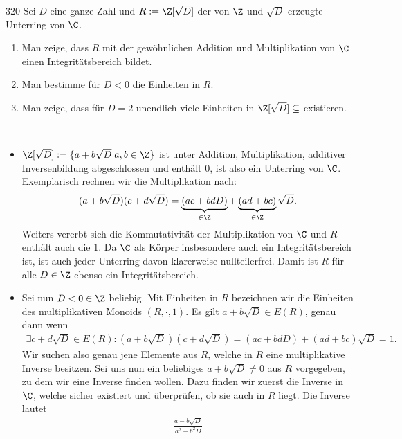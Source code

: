 \begin{algebraUE}{320}
Sei $D$ eine ganze Zahl und $R := \Z[\sqrt{D}]$ der von $\Z$ und $\sqrt{D}$
erzeugte Unterring von $\C$.
\begin{enumerate}
  \item Man zeige, dass $R$ mit der gewöhnlichen Addition und Multiplikation von $\C$
  einen Integritätsbereich bildet.
  \item Man bestimme für $D < 0$ die Einheiten in $R$.
  \item Man zeige, dass für $D = 2$ unendlich viele Einheiten in $\Z[\sqrt{D}] \subseteq $
  existieren.
\end{enumerate}
\end{algebraUE}
\begin{solution}
\leavevmode \\
\begin{itemize}
  \item $\Z[\sqrt{D}] := \{a + b\sqrt{D} | a,b \in \Z\}$ ist unter Addition, Multiplikation,
  additiver Inversenbildung abgeschlossen und enthält $0$, ist also ein Unterring von $\C$.
  Exemplarisch rechnen wir die Multiplikation nach:
  \begin{align*}
    (a + b\sqrt{D})(c + d\sqrt{D}) = \underbrace{(ac + bdD)}_{\in \Z} + \underbrace{(ad + bc)}_{\in \Z}\sqrt{D}.
  \end{align*}
  Weiters vererbt sich die Kommutativität der Multiplikation von $\C$ und $R$
  enthält auch die $1$.
  Da $\C$ als Körper insbesondere auch ein Integritätsbereich ist, ist auch
  jeder Unterring davon klarerweise nullteilerfrei. Damit ist $R$ für alle $D \in \Z$
  ebenso ein Integritätsbereich.
  \item Sei nun $D < 0 \in \Z$ beliebig. Mit Einheiten in $R$ bezeichnen wir die Einheiten
  des multiplikativen Monoids $(R,\cdot,1)$. Es gilt $a + b\sqrt{D} \in E(R)$, genau dann wenn
  \begin{align*}
    \exists c + d\sqrt{D} \in E(R): (a + b\sqrt{D})(c + d\sqrt{D}) =
    (ac + bdD) + (ad + bc)\sqrt{D} = 1.
  \end{align*}
  Wir suchen also genau jene Elemente aus $R$, welche in $R$ eine multiplikative Inverse besitzen.
  Sei uns nun ein beliebiges $a + b\sqrt{D} \neq 0$ aus $R$ vorgegeben, zu dem wir eine
  Inverse finden wollen. Dazu finden wir zuerst die Inverse in $\C$,
  welche sicher existiert und überprüfen, ob sie auch in $R$ liegt.
  Die Inverse lautet
  \begin{align*}
    \frac{a - b\sqrt{D}}{a^2 - b^2D}
  \end{align*}

\end{itemize}
\end{solution}

